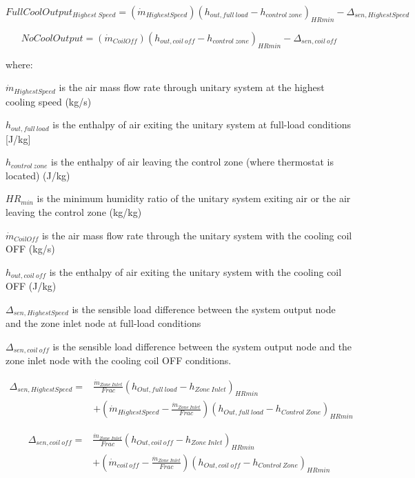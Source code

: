 \begin{equation}
  FullCoolOutpu{t_{Highest\;Speed}} = ({\dot m_{HighestSpeed}}){({h_{out,full~load}} - {h_{control~zone}})_{HRmin}} - {\Delta_{sen,HighestSpeed}}
\end{equation}

\begin{equation}
  NoCoolOutput = ({\dot m_{CoilOff}}){({h_{out,coil~off}} - {h_{control~zone}})_{HRmin}} - {\Delta_{sen,coil~off}}
\end{equation}

where:

\({\dot m_{HighestSpeed}}\) is the air mass flow rate through unitary system at the highest cooling speed (kg/s)

\(h_{out,full~load}\) is the enthalpy of air exiting the unitary system at full-load conditions {[}J/kg{]}

\(h_{control~zone}\) is the enthalpy of air leaving the control zone (where thermostat is located) (J/kg)

\(HR_{min}\) is the minimum humidity ratio of the unitary system exiting air or the air leaving the control zone (kg/kg)

\({\dot m_{CoilOff}}\) is the air mass flow rate through the unitary system with the cooling coil OFF (kg/s)

\(h_{out,coil~off}\) is the enthalpy of air exiting the unitary system with the cooling coil OFF (J/kg)

\(\Delta_{sen,HighestSpeed}\) is the sensible load difference between the system output node and the zone inlet node at full-load conditions

\(\Delta_{sen,coil~off}\) is the sensible load difference between the system output node and the zone inlet node with the cooling coil OFF conditions.

\begin{equation}
\begin{array}{rl}
{\Delta_{sen,HighestSpeed}} = & \frac{\dot{m}_{Zone~Inlet}}{Frac} {\left( {{h_{Out,full~load}} - {h_{Zone~Inlet}}} \right)_{HRmin}} \\
 & + \left( {\dot{m}_{HighestSpeed}} - \frac{\dot{m}_{Zone~Inlet}}{Frac} \right){\left( {{h_{Out,full~load}} - {h_{Control~Zone}}} \right)_{HRmin}}
\end{array}
\end{equation}

\begin{equation}
\begin{array}{rl}
{\Delta_{sen,coil~off}} = & \frac{\dot{m}_{Zone~Inlet}}{Frac} {\left( {{h_{Out,coil~off}} - {h_{Zone~Inlet}}} \right)_{HRmin}} \\
 & + \left( {\dot{m}_{coil~off}} - \frac{\dot{m}_{Zone~Inlet}}{Frac} \right) {\left( {{h_{Out,coil~off}} - {h_{Control~Zone}}} \right)_{HRmin}}
\end{array}
\end{equation}

